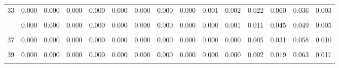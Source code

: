 \documentclass[
]{article}
\begin{document}
\begin{table}[!h]
{\begin{tabular}[t]{ccccccccccccccc}
33 & 0.000 & 0.000 & 0.000 & 0.000 & 0.000 & 0.000 & 0.000 & 0.000 & 0.001 & 0.002 & 0.022 & 0.060 & 0.036 & 0.003\\
\cellcolor{gray!10}{34} & \cellcolor{gray!10}{0.000} & \cellcolor{gray!10}{0.000} & \cellcolor{gray!10}{0.000} & \cellcolor{gray!10}{0.000} & \cellcolor{gray!10}{0.000} & \cellcolor{gray!10}{0.000} & \cellcolor{gray!10}{0.000} & \cellcolor{gray!10}{0.000} & \cellcolor{gray!10}{0.001} & \cellcolor{gray!10}{0.001} & \cellcolor{gray!10}{0.016} & \cellcolor{gray!10}{0.053} & \cellcolor{gray!10}{0.042} & \cellcolor{gray!10}{0.004}\\
\addlinespace
35 & 0.000 & 0.000 & 0.000 & 0.000 & 0.000 & 0.000 & 0.000 & 0.000 & 0.000 & 0.001 & 0.011 & 0.045 & 0.049 & 0.005\\
\cellcolor{gray!10}{36} & \cellcolor{gray!10}{0.000} & \cellcolor{gray!10}{0.000} & \cellcolor{gray!10}{0.000} & \cellcolor{gray!10}{0.000} & \cellcolor{gray!10}{0.000} & \cellcolor{gray!10}{0.000} & \cellcolor{gray!10}{0.000} & \cellcolor{gray!10}{0.000} & \cellcolor{gray!10}{0.000} & \cellcolor{gray!10}{0.000} & \cellcolor{gray!10}{0.008} & \cellcolor{gray!10}{0.038} & \cellcolor{gray!10}{0.054} & \cellcolor{gray!10}{0.008}\\
37 & 0.000 & 0.000 & 0.000 & 0.000 & 0.000 & 0.000 & 0.000 & 0.000 & 0.000 & 0.000 & 0.005 & 0.031 & 0.058 & 0.010\\
\cellcolor{gray!10}{38} & \cellcolor{gray!10}{0.000} & \cellcolor{gray!10}{0.000} & \cellcolor{gray!10}{0.000} & \cellcolor{gray!10}{0.000} & \cellcolor{gray!10}{0.000} & \cellcolor{gray!10}{0.000} & \cellcolor{gray!10}{0.000} & \cellcolor{gray!10}{0.000} & \cellcolor{gray!10}{0.000} & \cellcolor{gray!10}{0.000} & \cellcolor{gray!10}{0.004} & \cellcolor{gray!10}{0.024} & \cellcolor{gray!10}{0.061} & \cellcolor{gray!10}{0.013}\\
39 & 0.000 & 0.000 & 0.000 & 0.000 & 0.000 & 0.000 & 0.000 & 0.000 & 0.000 & 0.000 & 0.002 & 0.019 & 0.063 & 0.017\\
\addlinespace
\cellcolor{gray!10}{40} & \cellcolor{gray!10}{0.000} & \cellcolor{gray!10}{0.000} & \cellcolor{gray!10}{0.000} & \cellcolor{gray!10}{0.000} & \cellcolor{gray!10}{0.000} & \cellcolor{gray!10}{0.000} & \cellcolor{gray!10}{0.000} & \cellcolor{gray!10}{0.000} & \cellcolor{gray!10}{0.000} & \cellcolor{gray!10}{0.000} & \cellcolor{gray!10}{0.001} & \cellcolor{gray!10}{0.014} & \cellcolor{gray!10}{0.063} & \cellcolor{gray!10}{0.021}\\
\bottomrule
\end{tabular}}
\end{table}
\end{document}
